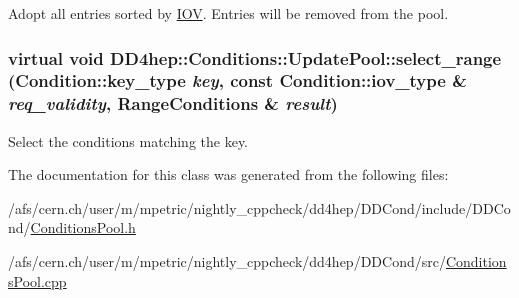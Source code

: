 Adopt all entries sorted by \hyperlink{class_d_d4hep_1_1_i_o_v}{IOV}. Entries will be removed from the pool. \hypertarget{class_d_d4hep_1_1_conditions_1_1_update_pool_a3cd5432ff682a8da5c9402814a1bd995}{
\subsubsection[{select\_\-range}]{\setlength{\rightskip}{0pt plus 5cm}virtual void DD4hep::Conditions::UpdatePool::select\_\-range ({\bf Condition::key\_\-type} {\em key}, \/  const {\bf Condition::iov\_\-type} \& {\em req\_\-validity}, \/  {\bf RangeConditions} \& {\em result})}}
\label{class_d_d4hep_1_1_conditions_1_1_update_pool_a3cd5432ff682a8da5c9402814a1bd995}


Select the conditions matching the key. 

The documentation for this class was generated from the following files:\begin{DoxyCompactItemize}
\item 
/afs/cern.ch/user/m/mpetric/nightly\_\-cppcheck/dd4hep/DDCond/include/DDCond/\hyperlink{_conditions_pool_8h}{ConditionsPool.h}\item 
/afs/cern.ch/user/m/mpetric/nightly\_\-cppcheck/dd4hep/DDCond/src/\hyperlink{_conditions_pool_8cpp}{ConditionsPool.cpp}\end{DoxyCompactItemize}
